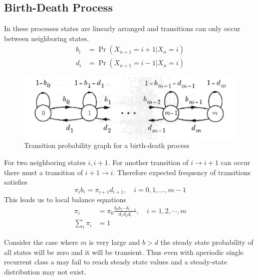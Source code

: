 \subsection{Birth-Death Process}
In these processes states are linearly arranged and transitions can only occur between neighboring states.
\begin{align*}
    b_i &= \Pr(X_{n+1}=i+1 | X_n=i) \\
    d_i &= \Pr(X_{n+1}=i-1 | X_n=i)
\end{align*}

\begin{figure}[!h]
   \centering
   \includegraphics[width=.6\textwidth]{images/P_Markov_Birth_Death.png}
   \caption{Transition probability graph for a birth-death process}
\end{figure}

For two neighboring states $i, i+1$. For another transition of $i \to i+1$ can occur there must a transition of $i+1 \to i$. Therefore expected frequency of transitions satisfies
\[\pi_i b_i=\pi_{i+1}d_{i+1}, \quad i=0,1,\ldots,m-1\]
This leads us to local balance equations
\begin{align*}
    \pi_i &= \pi_0 \frac{b_0 b_1 \cdots b_{i-1}}{d_1 d_2 d_i}, \quad i=1,2,\cdots, m \\
    \sum_i \pi_i &= 1
\end{align*}

\begin{remark}
    Consider the case where $m$ is very large and $b>d$ the steady state probability of all states will be zero and it will be transient. Thus even with aperiodic single recurrent class a \MC{} may fail to reach steady state values and a steady-state distribution may not exist.
\end{remark}